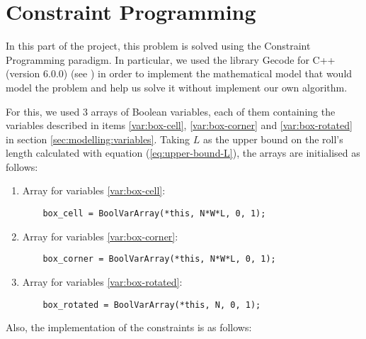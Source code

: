 \section{Constraint Programming}
\label{sec:constraint-programming}

In this part of the project, this problem is solved using the Constraint Programming
paradigm. In particular, we used the library Gecode for C++ (version 6.0.0)
(see \cite{GecodeWEB}) in order to implement the mathematical model that would model
the problem and help us solve it without implement our own algorithm.

\hfill

For this, we used 3 arrays of Boolean variables, each of them containing the
variables described in items \ref{var:box-cell}, \ref{var:box-corner} and
\ref{var:box-rotated} in section \ref{sec:modelling:variables}. Taking $L$
as the upper bound on the roll's length calculated with equation
(\ref{eq:upper-bound-L}), the arrays are initialised as follows:

\begin{enumerate}
    \item Array for variables \ref{var:box-cell}:
    
    \begin{lstlisting}
    box_cell = BoolVarArray(*this, N*W*L, 0, 1);
    \end{lstlisting}
    
    \item Array for variables \ref{var:box-corner}:
    
    \begin{lstlisting}
    box_corner = BoolVarArray(*this, N*W*L, 0, 1);
    \end{lstlisting}
    
    \item Array for variables \ref{var:box-rotated}:
    
    \begin{lstlisting}
    box_rotated = BoolVarArray(*this, N, 0, 1);
    \end{lstlisting}
    
\end{enumerate}

Also, the implementation of the constraints is as follows:

